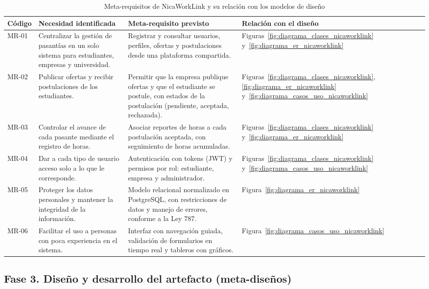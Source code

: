 \begin{table}[htbp]
\centering
\footnotesize
\caption{Meta-requisitos de NicaWorkLink y su relación con los modelos de diseño}\label{tab:meta-requisitos}
\begin{tabularx}{\textwidth}{|>{\raggedright\arraybackslash}p{1.6cm}|X|X|>{\raggedright\arraybackslash}p{2.8cm}|}
\hline
\rowcolor{gray!15}
\textbf{Código} & \textbf{Necesidad identificada} & \textbf{Meta-requisito previsto} & \textbf{Relación con el diseño} \\ \hline
MR-01 & Centralizar la gestión de pasantías en un solo sistema para estudiantes, empresas y universidad. & Registrar y consultar usuarios, perfiles, ofertas y postulaciones desde una plataforma compartida. & Figuras~\ref{fig:diagrama_clases_nicaworklink} y~\ref{fig:diagrama_er_nicaworklink} \\ \hline
MR-02 & Publicar ofertas y recibir postulaciones de los estudiantes. & Permitir que la empresa publique ofertas y que el estudiante se postule, con estados de la postulación (pendiente, aceptada, rechazada). & Figuras~\ref{fig:diagrama_clases_nicaworklink}, \ref{fig:diagrama_er_nicaworklink} y~\ref{fig:diagrama_casos_uso_nicaworklink} \\ \hline
MR-03 & Controlar el avance de cada pasante mediante el registro de horas. & Asociar reportes de horas a cada postulación aceptada, con seguimiento de horas acumuladas. & Figuras~\ref{fig:diagrama_clases_nicaworklink} y~\ref{fig:diagrama_er_nicaworklink} \\ \hline
MR-04 & Dar a cada tipo de usuario acceso solo a lo que le corresponde. & Autenticación con tokens (JWT) y permisos por rol: estudiante, empresa y administrador. & Figuras~\ref{fig:diagrama_clases_nicaworklink} y~\ref{fig:diagrama_casos_uso_nicaworklink} \\ \hline
MR-05 & Proteger los datos personales y mantener la integridad de la información. & Modelo relacional normalizado en PostgreSQL, con restricciones de datos y manejo de errores, conforme a la Ley 787. & Figura~\ref{fig:diagrama_er_nicaworklink} \\ \hline
MR-06 & Facilitar el uso a personas con poca experiencia en el sistema. & Interfaz con navegación guiada, validación de formularios en tiempo real y tableros con gráficos. & Figura~\ref{fig:diagrama_casos_uso_nicaworklink} \\ \hline
\end{tabularx}
\end{table}

\subsection{Fase 3. Diseño y desarrollo del artefacto (meta-diseños)}

